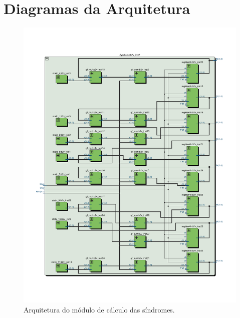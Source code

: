 \chapter{Diagramas da Arquitetura}

\begin{figure}[h]
	\caption{\label{fig_sindrome_arq}Arquitetura do módulo de cálculo das síndromes.}
	\centering
	\includegraphics[width=1.0\textwidth, trim={1.5cm 1.2cm 1.5cm 3cm}, clip]{RS/SindromeRTL.pdf}
\end{figure}

